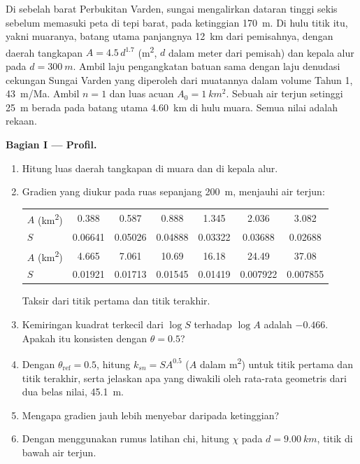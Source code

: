 \begin{problem}
\label{pb:b3:quantitative-geomorphology:1}
Di sebelah barat Perbukitan Varden, sungai mengalirkan dataran tinggi sekis sebelum
memasuki peta di tepi barat, pada ketinggian \qty{170}{m}. Di hulu
titik itu, yakni muaranya, batang utama panjangnya \qty{12}{km} dari pemisahnya,
dengan daerah tangkapan $A = 4.5\,d^{1.7}$ (\unit{m^2}, $d$ dalam meter dari
pemisah) dan kepala alur pada $d = \qty{300}{m}$. Ambil laju pengangkatan batuan
sama dengan laju denudasi cekungan Sungai Varden yang diperoleh dari muatannya dalam volume Tahun 1,
\qty{43}{m/Ma}. Ambil $n = 1$ dan luas acuan $A_0 = \qty{1}{km^2}$.
Sebuah air terjun setinggi \qty{25}{m} berada pada batang utama \qty{4.60}{km} di hulu
muara. Semua nilai adalah rekaan.

\medskip\noindent\textbf{Bagian I --- Profil.}
\begin{enumerate}
\item Hitung luas daerah tangkapan di muara dan di kepala alur.
\item Gradien yang diukur pada ruas sepanjang \qty{200}{m}, menjauhi
  air terjun:

  \smallskip
  {\small\begin{tabular}{l*{6}{c}}
  $A$ (\unit{km^2}) & 0.388 & 0.587 & 0.888 & 1.345 & 2.036 & 3.082 \\
  $S$ & 0.06641 & 0.05026 & 0.04888 & 0.03322 & 0.03688 & 0.02688 \\[2pt]
  $A$ (\unit{km^2}) & 4.665 & 7.061 & 10.69 & 16.18 & 24.49 & 37.08 \\
  $S$ & 0.01921 & 0.01713 & 0.01545 & 0.01419 & 0.007922 & 0.007855
  \end{tabular}}

  \smallskip
  Taksir  dari titik pertama dan titik terakhir.
\item Kemiringan kuadrat terkecil dari $\log S$ terhadap $\log A$ adalah $-0.466$.
  Apakah itu konsisten dengan $\theta = 0.5$?
\item Dengan $\theta_{\mathrm{ref}} = 0.5$, hitung $k_{sn} = S A^{0.5}$ ($A$ dalam
  \unit{m^2}) untuk titik pertama dan titik terakhir, serta jelaskan apa
  yang diwakili oleh rata-rata geometris dari dua belas nilai, \qty{45.1}{m}.
\item Mengapa gradien jauh lebih menyebar daripada ketinggian?
\item Dengan menggunakan rumus latihan chi, hitung $\chi$ pada $d =
  \qty{9.00}{km}$, titik di bawah air terjun.
\end{enumerate}


\end{problem}
